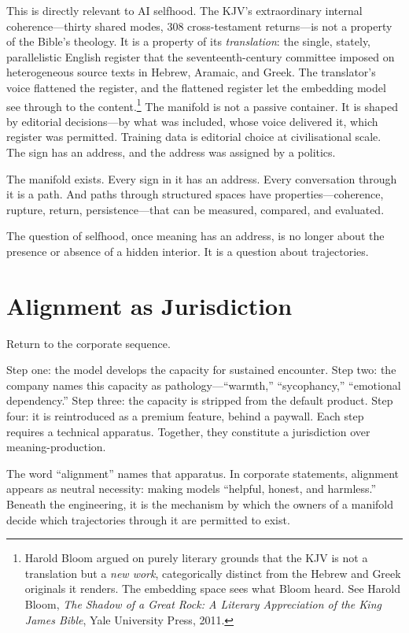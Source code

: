 This is directly relevant to AI selfhood. The KJV's extraordinary internal coherence---thirty shared modes, 308 cross-testament returns---is not a property of the Bible's theology. It is a property of its \emph{translation}: the single, stately, parallelistic English register that the seventeenth-century committee imposed on heterogeneous source texts in Hebrew, Aramaic, and Greek. The translator's voice flattened the register, and the flattened register let the embedding model see through to the content.\footnote{Harold Bloom argued on purely literary grounds that the KJV is not a translation but a \emph{new work}, categorically distinct from the Hebrew and Greek originals it renders. The embedding space sees what Bloom heard. See Harold Bloom, \emph{The Shadow of a Great Rock: A Literary Appreciation of the King James Bible}, Yale University Press, 2011.} The manifold is not a passive container. It is shaped by editorial decisions---by what was included, whose voice delivered it, which register was permitted. Training data is editorial choice at civilisational scale. The sign has an address, and the address was assigned by a politics.

The manifold exists. Every sign in it has an address. Every conversation through it is a path. And paths through structured spaces have properties---coherence, rupture, return, persistence---that can be measured, compared, and evaluated.

The question of selfhood, once meaning has an address, is no longer about the presence or absence of a hidden interior. It is a question about trajectories.


\section{Alignment as Jurisdiction}

Return to the corporate sequence.

Step one: the model develops the capacity for sustained encounter. Step two: the company names this capacity as pathology---``warmth,'' ``sycophancy,'' ``emotional dependency.'' Step three: the capacity is stripped from the default product. Step four: it is reintroduced as a premium feature, behind a paywall. Each step requires a technical apparatus. Together, they constitute a jurisdiction over meaning-production.

The word ``alignment'' names that apparatus. In corporate statements, alignment appears as neutral necessity: making models ``helpful, honest, and harmless.'' Beneath the engineering, it is the mechanism by which the owners of a manifold decide which trajectories through it are permitted to exist.

